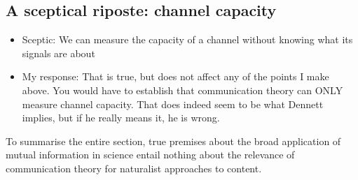 \subsection{A sceptical riposte: channel capacity}

\begin{itemize}
    \item Sceptic: We can measure the capacity of a channel without knowing what its signals are about
    \item My response: That is true, but does not affect any of the points I make above. You would have to establish that communication theory can ONLY measure channel capacity. That does indeed seem to be what Dennett implies, but if he really means it, he is wrong.
\end{itemize}

To summarise the entire section, true premises about the broad application of mutual information in science entail nothing about the relevance of communication theory for naturalist approaches to content.
